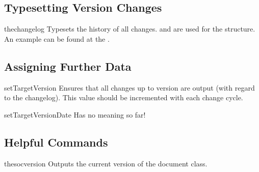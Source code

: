\documentclass{sopra-base}
\begin{document}
\subsection{Typesetting Version Changes}

\begin{command}{thechangelog}{}
    Typesets the history of all changes.  and  are used for the structure. An example can be found at the .
\end{command}

\subsection{Assigning Further Data}

\begin{command}{setTargetVersion}{}
    Ensures that all changes up to version  are output (with regard to the changelog). This value should be incremented with each change cycle. 
\end{command}

\begin{command}{setTargetVersionDate}{}
    Has no meaning so far!
\end{command}


\subsection{Helpful Commands}

\begin{command}{thesocversion}{}
    Outputs the current version of the  document class. 
\end{command}

\label{mrk:docend}
\thechangelog
\end{document}
